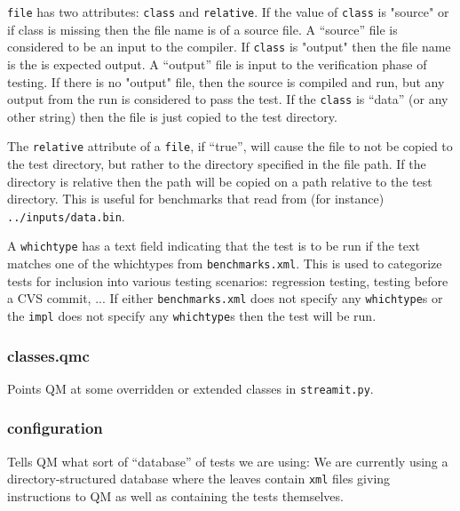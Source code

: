 \documentclass[11pt]{article}
\begin{document}
{\tt file} has two attributes: {\tt class} and {\tt relative}.  
If the value of {\tt class}
is "source" or if class is missing then the file name is of a source
file. A ``source'' file is considered to be an input to the compiler.
 If {\tt class} is "output" then the file name is the is expected
output. A ``output'' file is input to the verification phase of testing.
If there is no "output" file, then the source is compiled and
run, but any output from the run is considered to pass the test.
If the {\tt class} is ``data'' (or any other string) then the file is just 
copied to the test directory. 

The {\tt relative} attribute of a {\tt file}, if ``true'', will cause the 
file to not be copied to the test directory, but rather to the directory
specified in the file path.  If the directory is relative then the path will
be copied on a path relative to the test directory.  This is useful for
benchmarks that read from (for instance) {\tt ../inputs/data.bin}. 


A {\tt whichtype} has a text field indicating that the test is to be run
if the text matches one of the whichtypes from {\tt benchmarks.xml}.
This is used to categorize tests for inclusion into various testing
scenarios: regression testing, testing before a CVS commit, ... 
If either {\tt benchmarks.xml} does not specify any {\tt whichtype}s
or the {\tt impl} does not specify any {\tt whichtype}s then the test
will be run.

\subsubsection{classes.qmc}
Points QM at some overridden or extended classes in {\tt streamit.py}.

\subsubsection{configuration}
Tells QM what sort of ``database'' of tests we are using:  We are currently
using a directory-structured database where the leaves contain {\tt  xml} 
files giving instructions to QM as well as containing the tests themselves.
\end{document}
